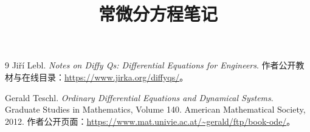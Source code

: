 \documentclass[UTF8,12pt,a4paper,fontset=fandol]{ctexbook}
\title{常微分方程笔记}
\author{}
\date{}
\begin{document}
\frontmatter %


\maketitle
\tableofcontents


\mainmatter















\appendix




\backmatter

\begin{thebibliography}{9}
  Jiří Lebl.
  \textit{Notes on Diffy Qs: Differential Equations for Engineers}.
  作者公开教材与在线目录：\url{https://www.jirka.org/diffyqs/}。

  Gerald Teschl.
  \textit{Ordinary Differential Equations and Dynamical Systems}.
  Graduate Studies in Mathematics, Volume 140.
  American Mathematical Society, 2012.
  作者公开页面：\url{https://www.mat.univie.ac.at/~gerald/ftp/book-ode/}。
\end{thebibliography}
\end{document}
